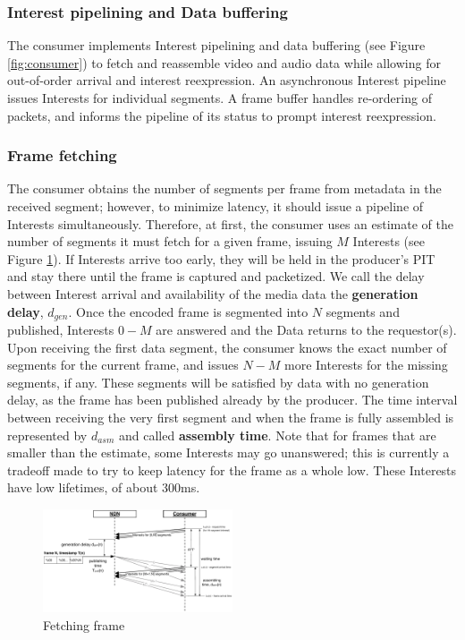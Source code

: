 \documentclass{icn/sig-alternate-2012} %
\begin{document}
\subsubsection{Interest pipelining and Data buffering}

The consumer implements Interest pipelining and data buffering (see Figure \ref{fig:consumer}) to fetch and reassemble video and audio data while allowing for out-of-order arrival and interest reexpression. An asynchronous Interest pipeline issues Interests for individual segments. A frame buffer handles re-ordering of packets, and informs the pipeline of its status to prompt interest reexpression.


\subsubsection{Frame fetching}

The consumer obtains the number of segments per frame from metadata in the received segment; however, to minimize latency, it should issue a pipeline of Interests simultaneously.  Therefore, at first, the consumer uses an estimate of the number of segments it must fetch for a given frame, issuing $M$ Interests (see Figure \ref{fig:pull}). If Interests arrive too early, they will be held in the producer's PIT and stay there until the frame is captured and packetized. We call the delay between Interest arrival and availability of the media data the \textbf{generation delay}, $d_{gen}$. Once the encoded frame is segmented into $N$ segments and published, Interests $0 - M$ are answered and the Data returns to the requestor(s). Upon receiving the first data segment, the consumer knows the exact number of segments for the current frame, and issues $N - M$ more Interests for the missing segments, if any. These segments will be satisfied by data with no generation delay, as the frame has been published already by the producer. The time interval between receiving the very first segment and when the frame is fully assembled is represented by $d_{asm}$ and called \textbf{assembly time}. Note that for frames that are smaller than the estimate, some Interests may go unanswered; this is currently a tradeoff made to try to keep latency for the frame as a whole low. These Interests have low lifetimes, of about 300ms. 
 

\begin{figure}[t!]
\centering
\includegraphics[width=0.5\textwidth]{frame-fetch}
\vspace{-18pt}
\caption{Fetching frame}
\label{fig:pull}
\end{figure}
\end{document}
